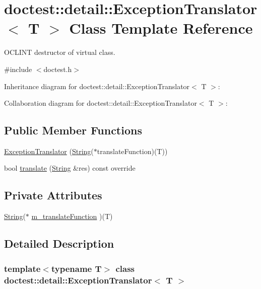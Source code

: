 \hypertarget{classdoctest_1_1detail_1_1ExceptionTranslator}{}\section{doctest\+:\+:detail\+:\+:Exception\+Translator$<$ T $>$ Class Template Reference}
\label{classdoctest_1_1detail_1_1ExceptionTranslator}


O\+C\+L\+I\+NT destructor of virtual class.  




{\ttfamily \#include $<$doctest.\+h$>$}



Inheritance diagram for doctest\+:\+:detail\+:\+:Exception\+Translator$<$ T $>$\+:


Collaboration diagram for doctest\+:\+:detail\+:\+:Exception\+Translator$<$ T $>$\+:
\subsection*{Public Member Functions}
\begin{DoxyCompactItemize}
\item 
\hyperlink{classdoctest_1_1detail_1_1ExceptionTranslator_a3ac05488993c40c6ba55ce51a6bf7eae}{Exception\+Translator} (\hyperlink{classdoctest_1_1String}{String}($\ast$translate\+Function)(T))
\item 
bool \hyperlink{classdoctest_1_1detail_1_1ExceptionTranslator_a56484c4218a06bbbd1548335a8b64110}{translate} (\hyperlink{classdoctest_1_1String}{String} \&res) const override
\end{DoxyCompactItemize}
\subsection*{Private Attributes}
\begin{DoxyCompactItemize}
\item 
\hyperlink{classdoctest_1_1String}{String}($\ast$ \hyperlink{classdoctest_1_1detail_1_1ExceptionTranslator_a739d70771e0f246622c81efde79fdf46}{m\+\_\+translate\+Function} )(T)
\end{DoxyCompactItemize}


\subsection{Detailed Description}
\subsubsection*{template$<$typename T$>$\newline
class doctest\+::detail\+::\+Exception\+Translator$<$ T $>$}

